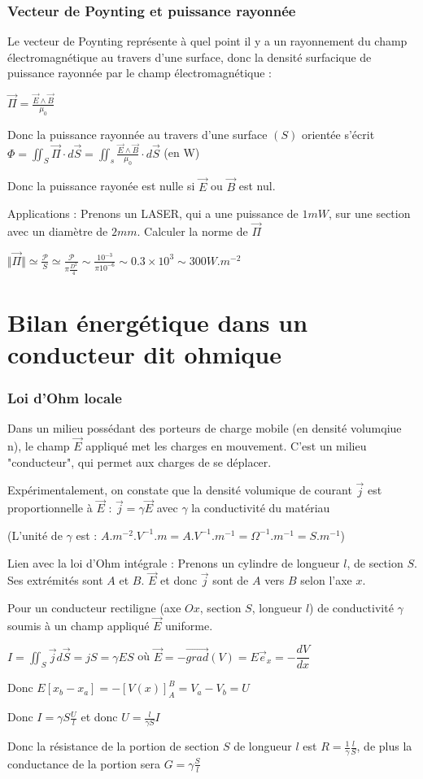 \documentclass[a4paper,12pt]{book}
\begin{document}
\subsubsection{Vecteur de Poynting et puissance rayonnée}
Le vecteur de Poynting représente à quel point il y a un rayonnement du champ électromagnétique au travers d'une surface, donc la densité surfacique de puissance rayonnée par le champ électromagnétique : \par $\vec{\Pi} = \frac{\vec{E}\wedge\vec{B}}{\mu_0}$
\par Donc la puissance rayonnée au travers d'une surface $(S)$ orientée s'écrit $\Phi = \iint_S\vec{\Pi}\cdot d\vec{S} = \iint_s\frac{\vec{E}\wedge\vec{B}}{\mu_0}\cdot d\vec{S}$ (en W) \par Donc la puissance rayonée est nulle si $\vec{E}$ ou $\vec{B}$ est nul.
\par Applications : Prenons un LASER, qui a une puissance de $1mW$, sur une section avec un diamètre de $2mm$. Calculer la norme de $\vec{\Pi}$
\par $\Vert\vec{\Pi}\Vert\simeq \frac{\mathcal{P}}{S}\simeq \frac{\mathcal{P}}{\pi\frac{D^2}{4}}\sim\frac{10^{-3}}{\pi 10^{-6}}\sim 0.3\times 10^{3}\sim 300 W.m^{-2}$

\section{Bilan énergétique dans un conducteur dit ohmique}
\subsubsection{Loi d'Ohm locale}
Dans un milieu possédant des porteurs de charge mobile (en densité volumqiue n), le champ $\vec{E}$ appliqué met les charges en mouvement. C'est un milieu "conducteur", qui permet aux charges de se déplacer.
\par Expérimentalement, on constate que la densité volumique de courant $\vec{j}$ est proportionnelle à $\vec{E}$ : $\vec{j} = \gamma\vec{E}$ avec $\gamma$ la conductivité du matériau \par (L'unité de $\gamma$ est : $A.m^{-2}.V^{-1}.m = A.V^{-1}.m^{-1}=\Omega^{-1}.m^{-1} = S.m^{-1}$)
\par Lien avec la loi d'Ohm intégrale : Prenons un cylindre de longueur $l$, de section $S$. Ses extrémités sont $A$ et $B$. $\vec{E}$ et donc $\vec{j}$ sont de $A$ vers $B$ selon l'axe $x$.
\par Pour un conducteur rectiligne (axe $Ox$, section $S$, longueur $l$) de conductivité $\gamma$ soumis à un champ appliqué $\vec{E}$ uniforme.
\par $I = \iint_S\vec{j}d\vec{S}=jS = \gamma ES$ où $\vec{E}=-\vec{grad}(V) = E\vec{e}_x = -\dfrac{d V}{dx}$ \par Donc $E[x_b-x_a]=-[V(x)]_A^B = V_a-V_b = U$
\par Donc $I=\gamma S\frac{U}{l}$ et donc $U=\frac{l}{\gamma S}I$ \par Donc la résistance de la portion de section $S$ de longueur $l$ est $R=\frac{1}{\gamma}\frac{l}{S}$, de plus la conductance de la portion sera $G=\gamma\frac{S}{l}$
\end{document}
